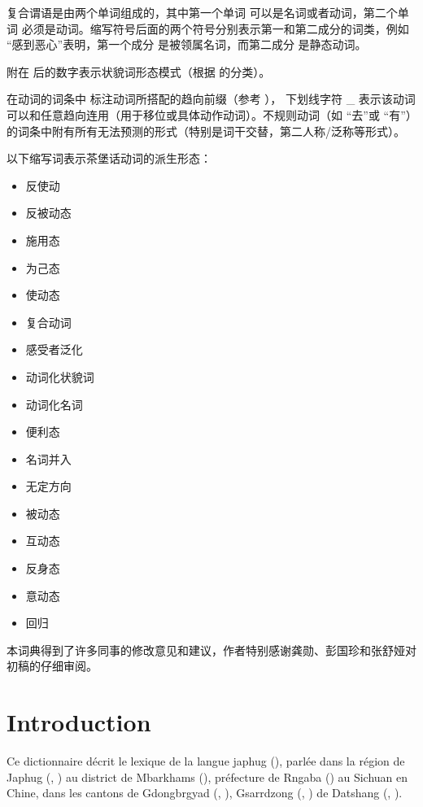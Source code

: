 复合谓语是由两个单词组成的，其中第一个单词  可以是名词或者动词，第二个单词 必须是动词。缩写符号后面的两个符号分别表示第一和第二成分的词类，例如   “感到恶心”表明，第一个成分  是被领属名词，而第二成分 是静态动词。

附在  后的数字表示状貌词形态模式（根据 \citealt{japhug14ideophones}的分类）。

在动词的词条中  标注动词所搭配的趋向前缀（参考 \citealt[267-9]{jacques14linking}）， 下划线字符 \_ 表示该动词可以和任意趋向连用（用于移位或具体动作动词）。不规则动词（如  “去”或    “有”）的词条中附有所有无法预测的形式（特别是词干交替，第二人称/泛称等形式）。

 以下缩写词表示茶堡话动词的派生形态：

\begin{itemize}
\item {} 反使动 
\item {} 反被动态
\item {} 施用态
\item {} 为己态
\item {} 使动态
\item {} 复合动词
\item {} 感受者泛化
\item {} 动词化状貌词
\item {} 动词化名词
\item {} 便利态
\item {} 名词并入
\item {} 无定方向
\item {} 被动态
\item {} 互动态
\item {} 反身态
\item {} 意动态
\item {} 回归
\end{itemize}

本词典得到了许多同事的修改意见和建议，作者特别感谢龚勋、彭国珍和张舒娅对初稿的仔细审阅。
\newpage
\normalfont
\section*{Introduction}

Ce  dictionnaire décrit le lexique de la langue japhug (), parlée dans la région de Japhug (, ) au district de Mbarkhams (), préfecture de Rngaba () au Sichuan en Chine, dans les cantons de Gdongbrgyad (, ), Gsarrdzong (,   ) de Datshang (, ).  

